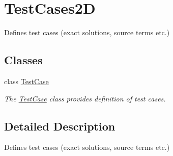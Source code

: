 \hypertarget{group__TestCases2D}{}\section{Test\+Cases2D}
\label{group__TestCases2D}


Defines test cases (exact solutions, source terms etc.)  


\subsection*{Classes}
\begin{DoxyCompactItemize}
\item 
class \hyperlink{classTestCase}{Test\+Case}
\begin{DoxyCompactList}\small\item\em The \hyperlink{classTestCase}{Test\+Case} class provides definition of test cases. \end{DoxyCompactList}\end{DoxyCompactItemize}


\subsection{Detailed Description}
Defines test cases (exact solutions, source terms etc.) 


